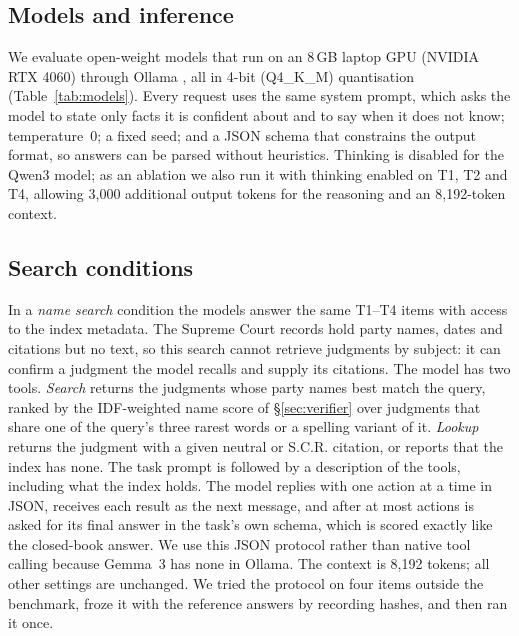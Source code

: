 \documentclass[conference]{IEEEtran}
\begin{document}
\subsection{Models and inference}
We evaluate open-weight models that run on an 8\,GB laptop GPU (NVIDIA RTX 4060) through Ollama \cite{ollama}, all in 4-bit (Q4\_K\_M) quantisation (Table~\ref{tab:models}). Every request uses the same system prompt, which asks the model to state only facts it is confident about and to say when it does not know; temperature~0; a fixed seed; and a JSON schema that constrains the output format, so answers can be parsed without heuristics. Thinking is disabled for the Qwen3 model; as an ablation we also run it with thinking enabled on T1, T2 and T4, allowing 3{,}000 additional output tokens for the reasoning and an 8{,}192-token context.

\begin{table}[t]
\caption{Models evaluated (Ollama builds, 4-bit Q4\_K\_M).}
\label{tab:models}
\centering
\footnotesize
\setlength{\tabcolsep}{4pt}

\end{table}

\subsection{Search conditions}
\label{sec:searchsetup}
In a \emph{name search} condition the models answer the same T1--T4 items with access to the index metadata. The Supreme Court records hold party names, dates and citations but no text, so this search cannot retrieve judgments by subject: it can confirm a judgment the model recalls and supply its citations. The model has two tools. \emph{Search} returns the \SearchK{} judgments whose party names best match the query, ranked by the IDF-weighted name score of \S\ref{sec:verifier} over judgments that share one of the query's three rarest words or a spelling variant of it. \emph{Lookup} returns the judgment with a given neutral or S.C.R. citation, or reports that the index has none. The task prompt is followed by a description of the tools, including what the index holds. The model replies with one action at a time in JSON, receives each result as the next message, and after at most \SearchMaxActions{} actions is asked for its final answer in the task's own schema, which is scored exactly like the closed-book answer. We use this JSON protocol rather than native tool calling because Gemma~3 has none in Ollama. The context is 8{,}192 tokens; all other settings are unchanged. We tried the protocol on four items outside the benchmark, froze it with the reference answers by recording hashes, and then ran it once.
\end{document}
